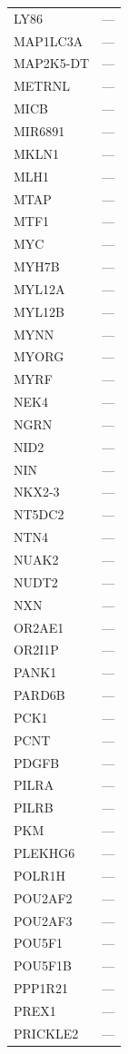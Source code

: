 \begin{longtable}{ll}
  LY86 & --- \\
  MAP1LC3A & --- \\
  MAP2K5-DT & --- \\
  METRNL & --- \\
  MICB & --- \\
  MIR6891 & --- \\
  MKLN1 & --- \\
  MLH1 & --- \\
  MTAP & --- \\
  MTF1 & --- \\
  MYC & --- \\
  MYH7B & --- \\
  MYL12A & --- \\
  MYL12B & --- \\
  MYNN & --- \\
  MYORG & --- \\
  MYRF & --- \\
  NEK4 & --- \\
  NGRN & --- \\
  NID2 & --- \\
  NIN & --- \\
  NKX2-3 & --- \\
  NT5DC2 & --- \\
  NTN4 & --- \\
  NUAK2 & --- \\
  NUDT2 & --- \\
  NXN & --- \\
  OR2AE1 & --- \\
  OR2I1P & --- \\
  PANK1 & --- \\
  PARD6B & --- \\
  PCK1 & --- \\
  PCNT & --- \\
  PDGFB & --- \\
  PILRA & --- \\
  PILRB & --- \\
  PKM & --- \\
  PLEKHG6 & --- \\
  POLR1H & --- \\
  POU2AF2 & --- \\
  POU2AF3 & --- \\
  POU5F1 & --- \\
  POU5F1B & --- \\
  PPP1R21 & --- \\
  PREX1 & --- \\
  PRICKLE2 & --- \\

\end{longtable}
